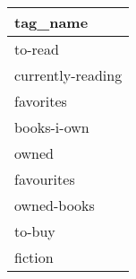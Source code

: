 \begin{tabular}{l}
\toprule
          tag\_name \\
\midrule
           to-read \\
 currently-reading \\
         favorites \\
       books-i-own \\
             owned \\
        favourites \\
       owned-books \\
            to-buy \\
           fiction \\
\bottomrule
\end{tabular}
